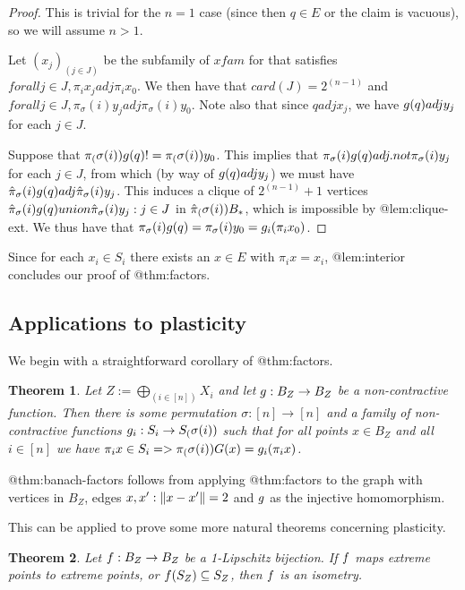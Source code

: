 \documentclass{amsart}
\newtheorem{theorem}{Theorem}
\theoremstyle{definition}
\begin{document}
\begin{proof}
    This is trivial for the $n=1$ case (since then $q \in E$ or the claim is vacuous), so we will assume $n > 1$.

    Let $(x_j)_(j \in J)$ be the subfamily of $xfam$ for that satisfies $forall j \in J, \pi_i x_j adj \pi_i x_0$. We then have that $card(J) = 2^(n-1)$ and $forall j \in J, \pi_\sigma(i)y_j adj \pi_\sigma(i) y_0$. Note also that since $q adj x_j$, we have $g(q) adj y_j$ for each $j \in J$.
  
    Suppose that $\pi_(\sigma(i)) g(q) != \pi_(\sigma(i)) y_0$. This implies that $\pi_\sigma(i)g(q) adj.not \pi_\sigma(i)y_j$ for each $j \in J$, from which (by way of $g(q) adj y_j$) we must have $\hat{\pi}_\sigma(i)g(q) adj \hat{\pi}_\sigma(i)y_j$. This induces a clique of $2^(n-1)+1$ vertices ${\hat{\pi}_\sigma(i)g(q)} union {\hat{\pi}_\sigma(i)y_j : j \in J}$ in $\hat{\pi}_(\sigma(i))B_*$, which is impossible by @lem:clique-ext. We thus have that $\pi_\sigma(i) g(q) = \pi_\sigma(i)y_0 = g_i (\pi_i x_0)$.
\end{proof}

Since for each $x_i \in S_i$ there exists an $x \in E$ with $\pi_i x = x_i$, @lem:interior concludes our proof of @thm:factors.

\subsection{Applications to plasticity}

We begin with a straightforward corollary of @thm:factors.

\begin{theorem} \label{thm:banach-factors}
    \annotation Let $Z := \bigoplus_(i \in [n]) X_i$ and let $g : B_Z \to B_Z$ be a non-contractive function. Then there is some permutation $\sigma : [n] \to [n]$ and a family of non-contractive functions $g_i : S_i \to S_(\sigma(i))$ such that for all points $x \in B_Z$ and all $i \in [n]$ we have 
    $\pi_i x \in S_i => \pi_(\sigma(i)) G(x) = g_i (\pi_i x)$.
\end{theorem}

@thm:banach-factors follows from applying @thm:factors to the graph with vertices in $B_Z$, edges ${{x,x'} : \norm{x-x'}=2}$ and $g$ as the injective homomorphism.

This can be applied to prove some more natural theorems concerning plasticity.

\begin{theorem} \label{thm:natural}
    \annotation
    Let $f: B_Z \to B_Z$ be a 1-Lipschitz bijection. If $f$ maps extreme points to extreme points, or $f(S_Z) \subseteq S_Z$, then $f$ is an isometry.
\end{theorem}
\end{document}
